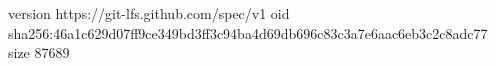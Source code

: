 version https://git-lfs.github.com/spec/v1
oid sha256:46a1c629d07ff9ce349bd3ff3c94ba4d69db696c83c3a7e6aac6eb3c2c8adc77
size 87689
